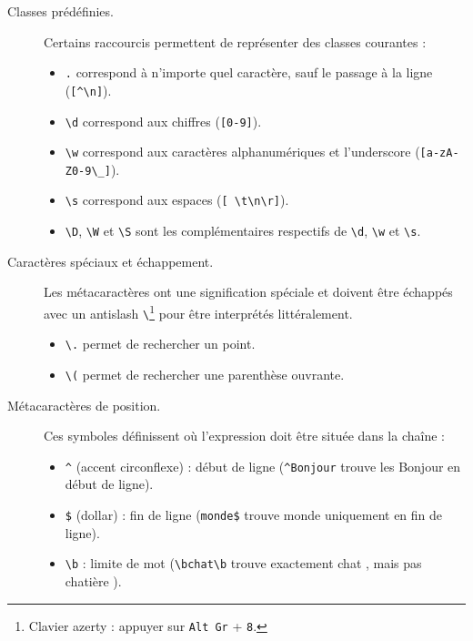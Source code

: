 \documentclass[correction]{td}
\begin{document}
\begin{description}
\item[Classes prédéfinies.] Certains raccourcis permettent de représenter des classes courantes :
  \begin{itemize}
  \item \lstinline{.} correspond à n'importe quel caractère, sauf le passage à la ligne (\lstinline{[^\n]}).
  \item \lstinline{\d} correspond aux chiffres (\lstinline{[0-9]}).
  \item \lstinline{\w} correspond aux caractères alphanumériques et l'underscore (\lstinline{[a-zA-Z0-9\_]}).
  \item \lstinline{\s} correspond aux espaces (\lstinline{[ \t\n\r]}).
  \item \lstinline{\D}, \lstinline{\W} et \lstinline{\S} sont les complémentaires respectifs de \lstinline{\d}, \lstinline{\w} et \lstinline{\s}.
  \end{itemize}

\item[Caractères spéciaux et échappement.]
  Les métacaractères ont une signification spéciale et doivent être échappés avec un antislash \lstinline{\}\footnote{Clavier azerty : appuyer sur \texttt{Alt Gr} + \texttt{8}.} pour être interprétés littéralement.
    \begin{itemize}
    \item \lstinline{\.} permet de rechercher un point.
    \item \lstinline{\(} permet de rechercher une parenthèse ouvrante.
    \end{itemize}

  \item[Métacaractères de position.] Ces symboles définissent où l'expression doit être située dans la chaîne :
    \begin{itemize}
    \item \lstinline{^} (accent circonflexe) : début de ligne (\lstinline{^Bonjour} trouve les \og Bonjour \fg{} en début de ligne).
    \item \lstinline{$} (dollar) : fin de ligne (\lstinline{monde$} trouve \og monde \fg{} uniquement en fin de ligne).
    \item \lstinline{\b} : limite de mot (\lstinline{\bchat\b} trouve exactement \og chat \fg, mais pas \og chatière \fg).
    \end{itemize}


\end{description}
\end{document}
